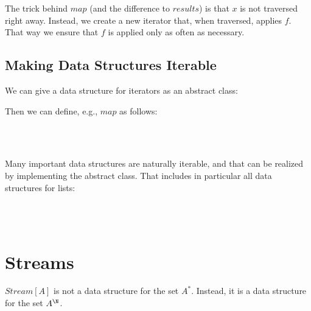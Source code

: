 The trick behind $map$ (and the difference to $results$) is that $x$ is not traversed right away.
Instead, we create a new iterator that, when traversed, applies $f$.
That way we ensure that $f$ is applied only as often as necessary.


\subsection{Making Data Structures Iterable}\label{sec:ad:iter:create}

We can give a data structure for iterators as an abstract class:
\begin{acode}
\end{acode}

Then we can define, e.g.,  $map$ as follows:
\begin{acode}
\\
\\
\end{acode}

Many important data structures are naturally iterable, and that can be realized by implementing the abstract class.
That includes in particular all data structures for lists:
\begin{acode}
\\
\\
\end{acode}

\section{Streams}

$Stream[A]$ is not a data structure for the set $A^*$.
Instead, it is a data structure for the set $A^\N$.

